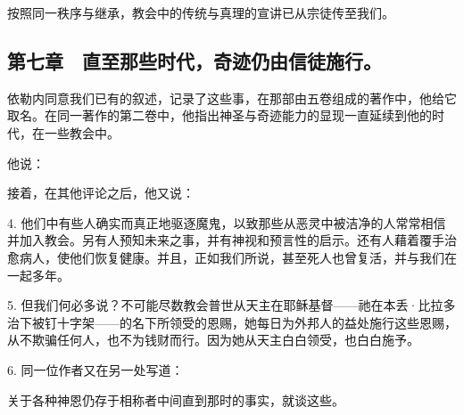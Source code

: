 按照同一秩序与继承，教会中的传统与真理的宣讲已从宗徒传至我们。\par


\subsection{第七章　直至那些时代，奇迹仍由信徒施行。}

依勒内同意我们已有的叙述，记录了这些事，在那部由五卷组成的著作中，他给它取名。在同一著作的第二卷中，他指出神圣与奇迹能力的显现一直延续到他的时代，在一些教会中。\par

他说：\par

\par

接着，在其他评论之后，他又说：\par

\par

4. 他们中有些人确实而真正地驱逐魔鬼，以致那些从恶灵中被洁净的人常常相信并加入教会。另有人预知未来之事，并有神视和预言性的启示。还有人藉着覆手治愈病人，使他们恢复健康。并且，正如我们所说，甚至死人也曾复活，并与我们在一起多年。\par

5. 但我们何必多说？不可能尽数教会普世从天主在耶稣基督——祂在本丢·比拉多治下被钉十字架——的名下所领受的恩赐，她每日为外邦人的益处施行这些恩赐，从不欺骗任何人，也不为钱财而行。因为她从天主白白领受，也白白施予。\par

6. 同一位作者又在另一处写道：\par

\par

关于各种神恩仍存于相称者中间直到那时的事实，就谈这些。\par

